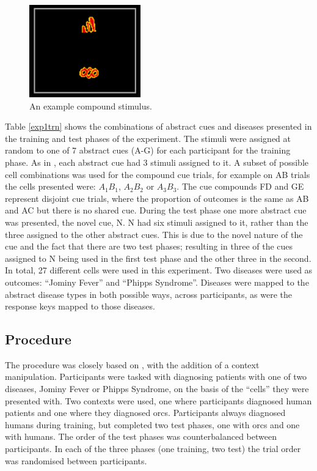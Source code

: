 \documentclass[twocolumn]{article}
\begin{document}
{\begin{figure}[b]
	\centering
	\includegraphics[width = .25\textwidth]{exp1trnclose.png}
	\caption[Example trial]{An example compound stimulus.}
	\label{cellexample}
\end{figure}

Table \ref{exp1trn} shows the combinations of abstract cues and diseases presented in the training and test phases of the experiment. The stimuli were assigned at random to one of 7 abstract cues (A-G) for each participant for the training phase. As in \cite{Wills2014}, each abstract cue had 3 stimuli assigned to it. A subset of possible cell combinations was used for the compound cue trials, for example on AB trials the cells presented were: $A_{1}B_{1}$, $A_{2}B_{2}$ or $A_{3}B_{3}$. The cue compounds FD and GE represent disjoint cue trials, where the proportion of outcomes is the same as AB and AC but there is no shared cue. During the test phase one more abstract cue was presented, the novel cue, N. N had six stimuli assigned to it, rather than the three assigned to the other abstract cues. This is due to the novel nature of the cue and the fact that there are two test phases; resulting in three of the cues assigned to N being used in the first test phase and the other three in the second. In total, 27 different cells were used in this experiment. Two diseases were used as outcomes: ``Jominy Fever'' and ``Phipps Syndrome''. Diseases were mapped to the abstract disease types in both possible ways, across participants, as were the response keys mapped to those diseases.

\subsection{Procedure}

The procedure was closely based on \cite{Wills2014}, with the addition of a context manipulation. Participants were tasked with diagnosing patients with one of two diseases, Jominy Fever or Phipps Syndrome, on the basis of the ``cells'' they were presented with. Two contexts were used, one where participants diagnosed human patients and one where they diagnosed orcs. Participants always diagnosed humans during training, but completed two test phases, one with orcs and one with humans. The order of the test phases was counterbalanced between participants. In each of the three phases (one training, two test) the trial order was randomised between participants.

}
\end{document}

